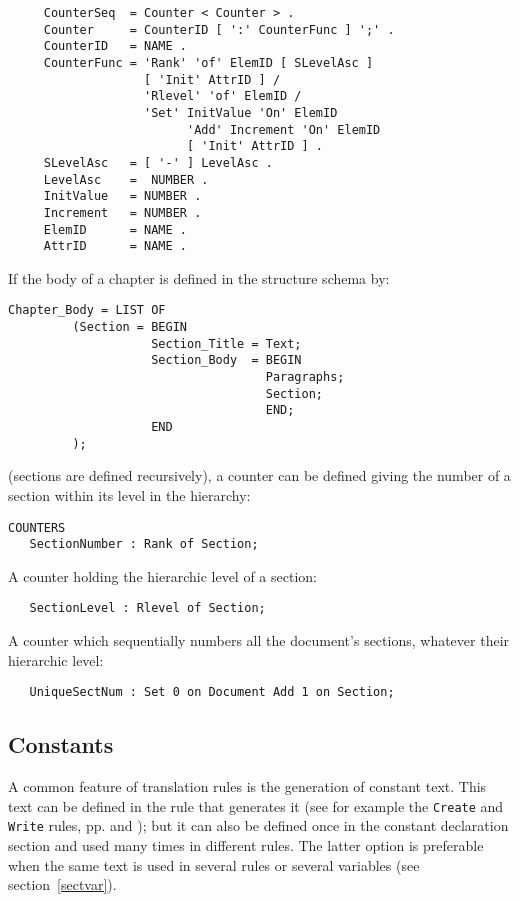 \begin{verbatim}
     CounterSeq  = Counter < Counter > .
     Counter     = CounterID [ ':' CounterFunc ] ';' .
     CounterID   = NAME .
     CounterFunc = 'Rank' 'of' ElemID [ SLevelAsc ]
                   [ 'Init' AttrID ] /
                   'Rlevel' 'of' ElemID /
                   'Set' InitValue 'On' ElemID
                         'Add' Increment 'On' ElemID
                         [ 'Init' AttrID ] .
     SLevelAsc   = [ '-' ] LevelAsc .
     LevelAsc    =  NUMBER .
     InitValue   = NUMBER .
     Increment   = NUMBER .
     ElemID      = NAME .
     AttrID      = NAME .
\end{verbatim}

\begin{example}
If the body of a chapter is defined in the structure schema by:
\begin{verbatim}
Chapter_Body = LIST OF
         (Section = BEGIN
                    Section_Title = Text;
                    Section_Body  = BEGIN
                                    Paragraphs;
                                    Section;
                                    END;
                    END
         );
\end{verbatim}
(sections are defined recursively), a counter can be defined giving
the number of a section within its level in the hierarchy:
\begin{verbatim}
COUNTERS
   SectionNumber : Rank of Section;
\end{verbatim}
\label{numsect}
A counter holding the hierarchic level of a section:
\begin{verbatim}
   SectionLevel : Rlevel of Section;
\end{verbatim}
A counter which sequentially numbers all the document's sections,
whatever their hierarchic level:
\begin{verbatim}
   UniqueSectNum : Set 0 on Document Add 1 on Section;
\end{verbatim}
\label{numunique}
\end{example}

\subsection{Constants}

A common feature of translation rules is the generation of constant
text.  This text can be defined in the rule that generates it (see for
example the {\tt Create} and {\tt Write} rules, pp. \pageref{create}
and \pageref{writerule}); but it can also be
defined once in the constant declaration section and used many times
in different rules.  The latter option is preferable when the same
text is used in several rules or several variables (see
section~\ref{sectvar}).


